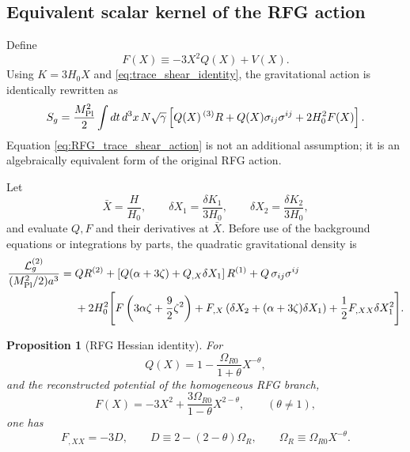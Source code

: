 \documentclass[11pt,a4paper]{article}
\newtheorem{proposition}[axiom]{Proposition}
\begin{document}
\subsection{Equivalent scalar kernel of the RFG action}

Define
\begin{equation}
F(X)\equiv -3X^2Q(X)+V(X).
\label{eq:F_definition}
\end{equation}
Using \(K=3H_0X\) and \eqref{eq:trace_shear_identity}, the gravitational
action is identically rewritten as
\begin{equation}
S_g=
\frac{M_{\rm Pl}^2}{2}
\int dt\,d^3x\,N\sqrt{\gamma}
\left[
Q(X)\,{}^{(3)}R
+Q(X)\sigma_{ij}\sigma^{ij}
+2H_0^2F(X)
\right].
\label{eq:RFG_trace_shear_action}
\end{equation}
Equation \eqref{eq:RFG_trace_shear_action} is not an additional assumption; it is an
algebraically equivalent form of the original RFG action.

Let
\begin{equation}
\bar X=\frac{H}{H_0},
\qquad
\delta X_1=\frac{\delta K_1}{3H_0},
\qquad
\delta X_2=\frac{\delta K_2}{3H_0},
\end{equation}
and evaluate \(Q,F\) and their derivatives at \(\bar X\).  Before use of the
background equations or integrations by parts, the quadratic gravitational
density is
\begin{align}
\frac{\mathcal L_g^{(2)}}{(M_{\rm Pl}^2/2)a^3}
={}&
Q R^{(2)}
+\left[Q(\alpha+3\zeta)+Q_{,X}\delta X_1\right]R^{(1)}
+Q\,\sigma_{ij}\sigma^{ij}
\nonumber\\
&+2H_0^2
\Bigg[
F\left(3\alpha\zeta+\frac{9}{2}\zeta^2\right)
+F_{,X}
\left(
\delta X_2+(\alpha+3\zeta)\delta X_1
\right)
+\frac{1}{2}F_{,XX}\delta X_1^2
\Bigg].
\label{eq:quadratic_gravity_density_compact}
\end{align}

\begin{proposition}[RFG Hessian identity]
For
\begin{equation}
Q(X)=1-\frac{\Omega_{R0}}{1+\theta}X^{-\theta},
\end{equation}
and the reconstructed potential of the homogeneous RFG branch,
\begin{equation}
F(X)
=
-3X^2+\frac{3\Omega_{R0}}{1-\theta}X^{2-\theta},
\qquad
(\theta\neq1),
\label{eq:F_RFG}
\end{equation}
one has
\begin{equation}
F_{,XX}=-3D,
\qquad
D\equiv2-(2-\theta)\Omega_R,
\qquad
\Omega_R\equiv\Omega_{R0}X^{-\theta}.
\label{eq:Fxx_identity}
\end{equation}
\end{proposition}
\end{document}
